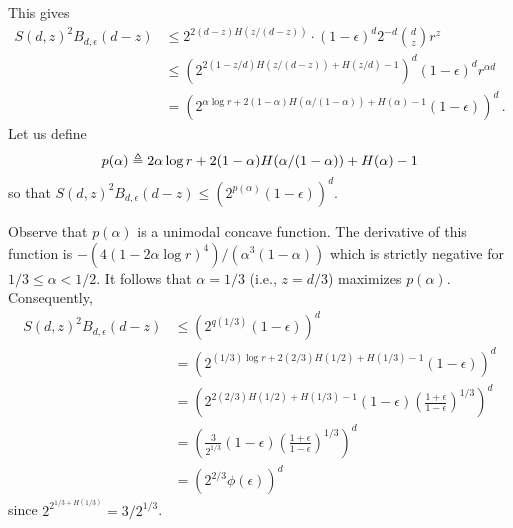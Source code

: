   This gives
  \begin{align*}
  S(d, z)^2 B_{d,\epsilon}(d-z) 
  &\leq 2^{2(d-z)H(z/(d-z))} \cdot (1-\epsilon)^d 2^{-d} {d \choose z}  r^{z} \\
  &\leq \left( 2^{2(1-z/d)H(z/(d-z)) + H(z/d) - 1} \right)^d (1-\epsilon)^d r^{\alpha d} \\
   &= \left( 2^{ \alpha \log r + 2(1-\alpha)H(\alpha/(1 - \alpha)) + H(\alpha) - 1} (1-\epsilon) \right)^d 
  \,.
  \end{align*}
  Let us define 
  \[
      p(\alpha) \triangleq 2 \alpha \log r + 2(1-\alpha)H(\alpha/(1 - \alpha)) + H(\alpha) - 1 
  \]
  so that 
  $
      S(d, z)^2 B_{d,\epsilon}(d-z) \leq \left(2^{p(\alpha)} (1-\epsilon) \right)^d
  $.

  Observe that $p(\alpha)$ is a unimodal concave function. 
  The derivative of this function is
  $
      -\left(4(1-2\alpha \log r)^4\right)/\left(\alpha^3(1-\alpha) \right)
  $
  which is strictly negative for $1/3 \leq \alpha < 1/2$. 
  It follows that $\alpha = 1/3$ (i.e., $z = d/3$) maximizes $p(\alpha)$. 
  Consequently,
  \begin{align*}
  S(d, z)^2 B_{d,\epsilon}(d-z)
  &\leq \left(2^{q(1/3)} (1-\epsilon) \right)^d \\
  &= \left( 2^{(1/3)\log r + 2(2/3)H(1/2) + H(1/3) - 1}  (1-\epsilon) \right)^d \\
  &= \left( 2^{2(2/3)H(1/2) + H(1/3) - 1}  (1-\epsilon)
   \left(\frac{1+\epsilon}{1-\epsilon}\right)^{1/3} \right)^d \\
  &= \left( \frac{3}{2^{1/3}}  (1-\epsilon)
   \left(\frac{1+\epsilon}{1-\epsilon}\right)^{1/3} \right)^d \\
   &= \left(2^{2/3} \phi(\epsilon) \right)^d 
  \end{align*}
  since $2^{2^{1/3 + H(1/3)}} = 3/2^{1/3}$.

